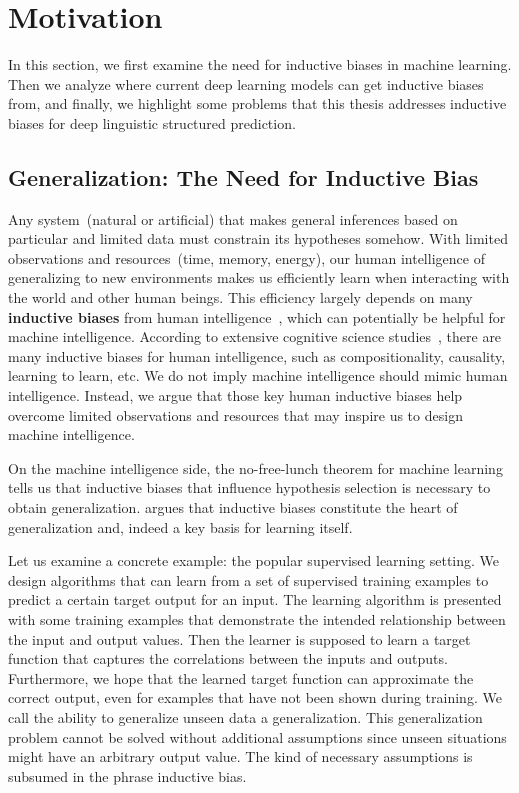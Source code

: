 \section{Motivation}
\label{sec:intro:motivation}

In this section, we first examine the need for inductive biases in
machine learning. Then we analyze where current deep learning models
can get inductive biases from, and finally, we highlight some problems
that this thesis addresses inductive biases for deep linguistic
structured prediction.

\subsection{Generalization: The Need for Inductive Bias}
\label{ssec:intro:need-of-bias}

Any system~(natural or artificial) that makes general inferences based on particular and limited data must constrain its hypotheses
somehow. With limited observations and resources~(time, memory,
energy), our human intelligence of generalizing to new environments
makes us efficiently learn when interacting with the world and other
human beings. This efficiency largely depends on many {\bf inductive
  biases} from human intelligence~\citep{Gershman2021WhatMU}, which
can potentially be helpful for machine intelligence. According to
extensive cognitive science
studies~\citep{Spelke1990PrinciplesOO,Bienenstock1996CompositionalityMP,Rehder2003ACT,harlow1949formation,
  Lake2016BuildingMT,Gershman2021WhatMU}, there are many inductive
biases for human intelligence, such as compositionality, causality,
learning to learn, etc. We do not imply machine intelligence
should mimic human intelligence. Instead, we argue that those key
human inductive biases help overcome limited observations and resources
that may inspire us to design machine intelligence.

On the machine intelligence side, the no-free-lunch theorem for
machine learning~\citep{baxter2000model,wolpert1995no} tells us that
inductive biases that influence hypothesis selection is necessary to
obtain generalization. \citet{mitchell1980need} argues that inductive
biases constitute the heart of generalization and, indeed a key basis
for learning itself.

Let us examine a concrete example: the popular supervised learning
setting. We design algorithms that can learn from a set of supervised
training examples to predict a certain target output for an input. The
learning algorithm is presented with some training examples that
demonstrate the intended relationship between the input and output
values. Then the learner is supposed to learn a target function that
captures the correlations between the inputs and outputs. Furthermore,
we hope that the learned target function can approximate the correct
output, even for examples that have not been shown during training. We
call the ability to generalize unseen data a generalization. This
generalization problem cannot be solved without additional assumptions
since unseen situations might have an arbitrary output value. The kind
of necessary assumptions is subsumed in the phrase inductive bias.

